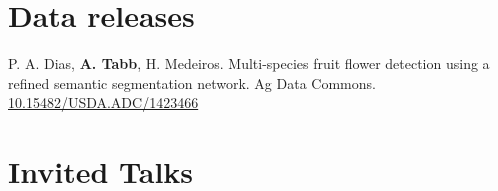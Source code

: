 \documentclass[letterpaper,11pt]{article}
\begin{document}
\section{Data releases}
\begin{enumerate}[noitemsep, leftmargin=*,label={[D\arabic*]}]
\item{P. A. Dias, \textbf{A. Tabb}, H. Medeiros.  Multi-species fruit flower detection using a refined semantic segmentation network. Ag Data Commons. \href{http://dx.doi.org/10.15482/USDA.ADC/1423466}{10.15482/USDA.ADC/1423466}}
\end{enumerate}

\section{Invited Talks}
\end{document}
